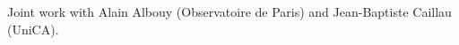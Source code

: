 \documentclass{article}
\begin{document}

 \noindent Joint work with Alain Albouy (Observatoire de Paris) and Jean-Baptiste Caillau (UniCA).
\end{document}
